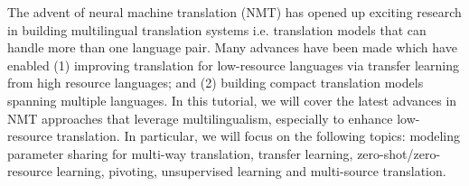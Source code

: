 The advent of neural machine translation (NMT) has opened up exciting research in building multilingual translation systems i.e. translation models that can handle more than one language pair. Many advances have been made which have enabled (1) improving translation for low-resource languages via transfer learning from high resource languages; and (2) building compact translation models spanning multiple languages. In this tutorial, we will cover the latest advances in NMT approaches that leverage multilingualism, especially to enhance low-resource translation. In particular, we will focus on the following topics: modeling parameter sharing for multi-way translation, transfer learning, zero-shot/zero-resource learning, pivoting, unsupervised learning and multi-source translation.
